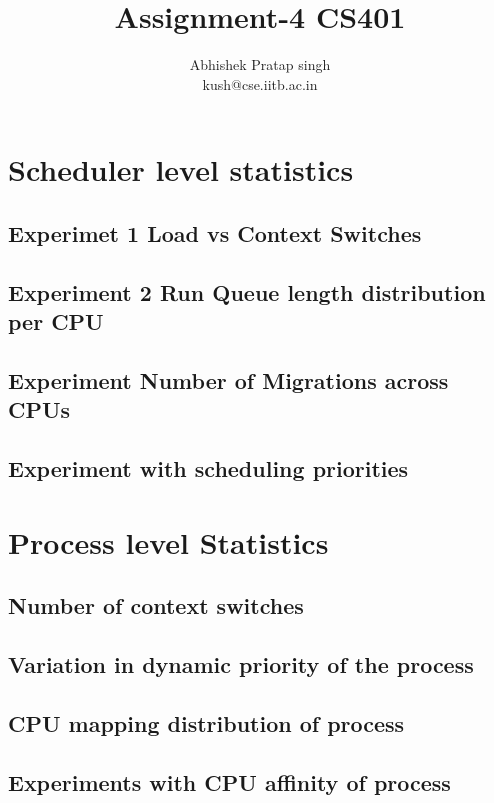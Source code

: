 \documentclass[a4paper,11pt,dvips]{report}
\title{{\bf Assignment-4 CS401} }
\author{Abhishek Pratap singh\\
kush@cse.iitb.ac.in}
\begin{document}
\maketitle
\tableofcontents
 \section{Scheduler level statistics}
 \subsection{Experimet 1 Load vs Context Switches}
 \subsection{Experiment 2 Run Queue length distribution per CPU}
 \subsection{Experiment Number of Migrations across CPUs}
 \subsection{Experiment with scheduling priorities}
 \section{Process level Statistics}
 \subsection{Number of context switches}
 \subsection{Variation in dynamic priority of the process}
 \subsection{CPU mapping distribution of process}
 \subsection{Experiments with CPU affinity of process}
 \begin{figure*}
\label{fig-circles}
\centering
\end{figure*}
\end{document}
